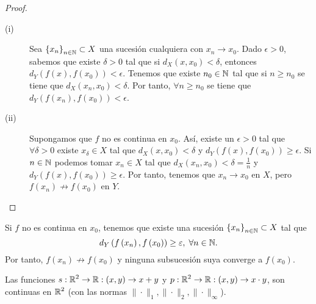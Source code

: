 \begin{proof}
\begin{description}
	\item[(i)] Sea $\displaystyle \left\{ x_{n}\right\} _{n\in\mathbb{N}}\subset X $ una sucesión cualquiera con $\displaystyle x_{n} \to x_{0} $. Dado $\displaystyle \epsilon > 0 $, sabemos que existe $\displaystyle \delta > 0 $ tal que si $\displaystyle d _{X}\left(x,x_{0}\right) < \delta  $, entonces $\displaystyle d _{Y}\left(f\left(x\right), f\left(x_{0}\right)\right) < \epsilon  $. Tenemos que existe $\displaystyle n_{0} \in \mathbb{N} $ tal que si $\displaystyle n \geq n_{0} $ se tiene que $\displaystyle d _{X}\left(x_{n}, x_{0}\right) < \delta  $. Por tanto, $\displaystyle \forall n \geq n_{0} $ se tiene que $\displaystyle d _{Y}\left(f\left(x_{n}\right), f\left(x_{0}\right)\right) < \epsilon  $.
	\item[(ii)] Supongamos que $\displaystyle f $ no es continua en $\displaystyle x_{0} $. Así, existe un $\displaystyle \epsilon > 0 $ tal que $\displaystyle \forall \delta > 0 $ existe $\displaystyle x_{\delta } \in X $ tal que $\displaystyle d _{X}\left(x, x_{0}\right) < \delta  $ y $\displaystyle d _{Y}\left(f\left(x\right), f\left(x_{0}\right)\right) \geq \epsilon  $. 
		Si $\displaystyle n \in \mathbb{N} $ podemos tomar $\displaystyle x_{n} \in X $ tal que $\displaystyle d _{X}\left(x_{n}, x_{0}\right) < \delta = \frac{1}{n} $ y $\displaystyle d _{Y}\left(f\left(x\right), f\left(x_{0}\right)\right) \geq \epsilon  $. Por tanto, tenemos que $\displaystyle x_{n} \to x_{0} $ en $\displaystyle X $, pero $\displaystyle f\left(x_{n}\right) \not \to f\left(x_{0}\right) $ en $\displaystyle Y $.  
\end{description}
\end{proof}
\begin{observation}
	Si $\displaystyle f $ no es continua en $\displaystyle x_{0} $, tenemos que existe una sucesión $\displaystyle \left\{ x_{n}\right\} _{n\in\mathbb{N}} \subset X $ tal que 
	\[ d _{Y}\left(f\left(x_{n}\right), f\left(x_{0}\right)\right) \geq \varepsilon, \; \forall n \in \mathbb{N} .\]
	Por tanto, $\displaystyle f\left(x_{n}\right) \not \to f\left(x_{0}\right) $ y ninguna subsucesión suya converge a $\displaystyle f\left(x_{0}\right) $.
\end{observation}
\begin{prop}
Las funciones $\displaystyle s : \mathbb{R}^{2} \to \mathbb{R} : \left(x,y\right) \to x + y $ y $\displaystyle p : \mathbb{R}^{2} \to \mathbb{R} : \left(x,y\right) \to x \cdot y $, son continuas en $\displaystyle \mathbb{R}^{2} $ (con las normas $\displaystyle \| \cdot \|_{1}, \| \cdot \|_{2}, \| \cdot \| _{\infty} $).
\end{prop}
